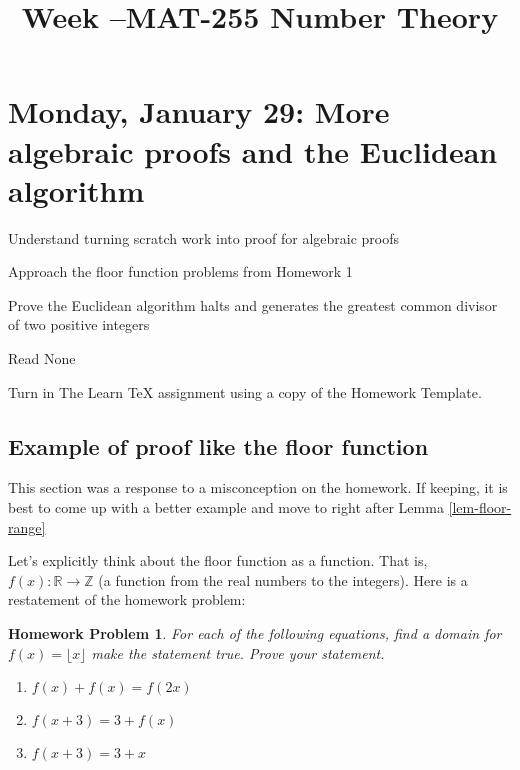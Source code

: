 \documentclass{ximera}
\title{Week \week--MAT-255 Number Theory}
\newtheorem*{prob}{Homework Problem}
\begin{document}
\section{Monday, January 29: More algebraic proofs and the Euclidean algorithm}

\begin{obj}
\item  Understand turning scratch work into proof for algebraic proofs
\item  Approach the floor function problems from Homework 1
\item Prove the Euclidean algorithm halts and generates the greatest common divisor of two positive integers
\end{obj}

\begin{pre}
 \item[Read] None 
 \item[Turn in] The Learn TeX assignment using a copy of the Homework Template.
\end{pre}
\subsection{Example of proof like the floor function}
\begin{remark}
	This section was a response to a misconception on the homework. %
	If keeping, it is best to come up with a better example and move to right after Lemma \ref{lem-floor-range}
\end{remark}

Let's explicitly think about the floor function as a function. That is, $f(x):\mathbb{R}\to\mathbb{Z}$ (a function from the real numbers to the integers). Here is a restatement of the homework problem:

\begin{prob}
For each of the following equations, find a domain for $f(x)=\lfloor x \rfloor$ make the statement true. Prove your statement. 
	\begin{enumerate}
 		\item $f( x ) + f( x ) =f( 2x)$
		\item $f( x + 3 )  = 3 +f( x)$
		\item $f( x +3 ) = 	3 + x$
	\end{enumerate} 
\end{prob}
\end{document}
